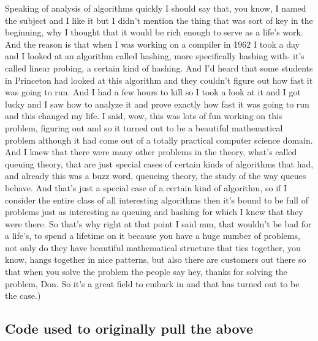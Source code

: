 \documentclass[]{article}
\begin{document}
Speaking of analysis of algorithms quickly I should say that, you know,
I named the subject and I like it but I didn't mention the thing that
was sort of key in the beginning, why I thought that it would be rich
enough to serve as a life's work. And the reason is that when I was
working on a compiler in 1962 I took a day and I looked at an algorithm
called hashing, more specifically hashing with- it's called linear
probing, a certain kind of hashing. And I'd heard that some students in
Princeton had looked at this algorithm and they couldn't figure out how
fast it was going to run. And I had a few hours to kill so I took a look
at it and I got lucky and I saw how to analyze it and prove exactly how
fast it was going to run and this changed my life. I said, wow, this was
lots of fun working on this problem, figuring out and so it turned out
to be a beautiful mathematical problem although it had come out of a
totally practical computer science domain. And I knew that there were
many other problems in the theory, what's called queuing theory, that
are just special cases of certain kinds of algorithms that had, and
already this was a buzz word, queueing theory, the study of the way
queues behave. And that's just a special case of a certain kind of
algorithm, so if I consider the entire class of all interesting
algorithms then it's bound to be full of problems just as interesting as
queuing and hashing for which I knew that they were there. So that's why
right at that point I said mm, that wouldn't be bad for a life's, to
spend a lifetime on it because you have a huge number of problems, not
only do they have beautiful mathematical structure that ties together,
you know, hangs together in nice patterns, but also there are customers
out there so that when you solve the problem the people say hey, thanks
for solving the problem, Don. So it's a great field to embark in and
that has turned out to be the case.)

\subsection{Code used to originally pull the
above}\label{code-used-to-originally-pull-the-above}
\end{document}
